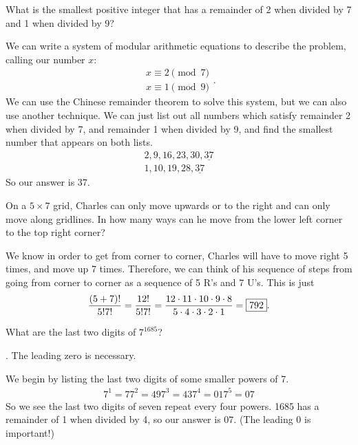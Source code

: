 \documentclass[11pt]{article}
\DeclareRobustCommand{\frac}[3][0pt]{%
  {\begingroup\hspace{#1}#2\hspace{#1}\endgroup\over\hspace{#1}#3\hspace{#1}}}
\begin{document}
\begin{problem}What is the smallest positive integer that has a remainder of 2 when divided by 7 and 1 when divided by 9?
\end{problem}
\begin{answer}
\end{answer}
\begin{solution}
We can write a system of modular arithmetic equations to describe the problem, calling our number $x$:
$$ \begin{array}{ll}
              	x \equiv 2 \pmod{7}\\
              	x \equiv 1 \pmod{9}
            	\end{array}
.
$$
We can use the Chinese remainder theorem to solve this system, but we can also use another technique. We can just list out all numbers which satisfy remainder 2 when divided by 7, and remainder 1 when divided by 9, and find the smallest number that appears on both lists.
\begin{align*}
2, 9, 16, 23, 30, \underline{37} \\
1, 10, 19, 28, \underline{37}
\end{align*}
So our answer is $\boxed{37}$.
\end{solution}

\begin{problem}On a $5 \times 7$ grid, Charles can only move upwards or to the right and can only move along gridlines. In how many ways can he move from the lower left corner to the top right corner?
\end{problem}
\begin{answer}
\end{answer}
\begin{solution}
We know in order to get from corner to corner, Charles will have to move right 5 times, and move up 7 times. Therefore, we can think of his sequence of steps from going from corner to corner as a sequence of 5 R's and 7 U's. This is just
$$\frac{(5+7)!}{5!7!}=\frac{12!}{5!7!} = \frac{12 \cdot 11 \cdot 10 \cdot 9 \cdot 8}{5 \cdot 4 \cdot 3 \cdot 2 \cdot 1} = \boxed{792}.$$
\end{solution}

\begin{problem}What are the last two digits of $7^{1685}$?
\end{problem}
\begin{answer}
. The leading zero is necessary.
\end{answer}
\begin{solution}
We begin by listing the last two digits of some smaller powers of 7.
\begin{align*}
7^1 = 7
7^2 = 49
7^3 = 43
7^4 = 01
7^5 = 07
\end{align*}
So we see the last two digits of seven repeat every four powers. 1685 has a remainder of 1 when divided by 4, so our answer is $\boxed{07}$. (The leading 0 is important!)
\end{solution}
\end{document}

